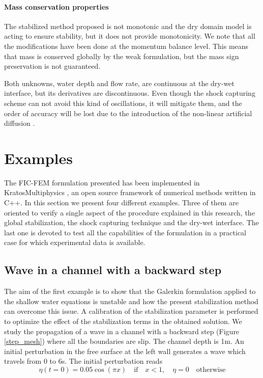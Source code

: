 \documentclass[a4paper,12pt]{elsarticle}
\begin{document}
\paragraph{Mass conservation properties}
The stabilized method proposed is not monotonic and the dry domain model is acting to ensure stability, but it does not provide monotonicity. We note that all the modifications have been done at the momentum balance level. This means that mass is conserved globally by the weak formulation, but the mass sign preservation is not guaranteed.

Both unknowns, water depth and flow rate, are continuous at the dry-wet interface, but its derivatives are discontinuous. Even though the shock capturing scheme can not avoid this kind of oscillations, it will mitigate them, and the order of accuracy will be lost due to the introduction of the non-linear artificial diffusion \cite{badia2014}.


\section{Examples}
\label{sec:examples}

The FIC-FEM formulation presented has been implemented in KratosMultiphysics \cite{dadvand2010, dadvand2013}, an open source framework of numerical methods written in C++.
In this section we present four different examples. Three of them are oriented to verify a single aspect of the procedure explained in this research, the global stabilization, the shock capturing technique and the dry-wet interface.
The last one is devoted to test all the capabilities of the formulation in a practical case for which experimental data is available.


\subsection{Wave in a channel with a backward step}

The aim of the first example is to show that the Galerkin formulation applied to the shallow water equations is unstable and how the present stabilization method can overcome this issue. A calibration of the stabilization parameter is performed to optimize the effect of the stabilization terms in the obtained solution.
We study the propagation of a wave in a channel with a backward step (Figure \ref{step_mesh}) where all the boundaries are slip. The channel depth is 1m. An initial perturbation in the free surface at the left wall generates a wave which travels from 0 to 6s. The initial perturbation reads
\begin{equation}
\eta(t=0) = 0.05\cos(\pi x) \quad \text{if} \quad x<1, \quad \eta=0 \quad \text{otherwise}
\end{equation}
\end{document}
